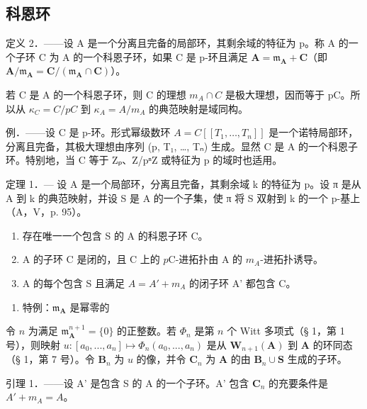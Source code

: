 \subsection{科恩环}

定义 2．——设 A 是一个分离且完备的局部环，其剩余域的特征为 p。称 A 的一个子环 C 为 A 的一个科恩子环，如果 C 是 p-环且满足 \(\mathbf{A} = \mathfrak{m}_{\mathbf{A}} + \mathbf{C}\)（即 \(\mathbf{A}/\mathfrak{m}_{\mathbf{A}} = \mathbf{C}/(\mathfrak{m}_{\mathbf{A}} \cap \mathbf{C})\)）。

若 C 是 A 的一个科恩子环，则 C 的理想 \(m_{A} \cap C\) 是极大理想，因而等于 pC。所以从 \(\kappa_{C} = C/pC\) 到 \(\kappa_{A} = A/m_{A}\) 的典范映射是域同构。

例．——设 C 是 p-环。形式幂级数环 \(A = C[[T_{1}, \ldots, T_{n}]]\) 是一个诺特局部环，分离且完备，其极大理想由序列 (p, T₁, \ldots, Tₙ) 生成。显然 C 是 A 的一个科恩子环。特别地，当 C 等于 Zₚ、Z/pⁿZ 或特征为 p 的域时也适用。

定理 1．— 设 A 是一个局部环，分离且完备，其剩余域 k 的特征为 p。设 π 是从 A 到 k 的典范映射，并设 S 是 A 的一个子集，使 π 将 S 双射到 k 的一个 p-基上（A，V，p. 95）。

\begin{enumerate}
\def\labelenumi{\alph{enumi})}
\item
  存在唯一一个包含 S 的 A 的科恩子环 C。
\item
  A 的子环 C 是闭的，且 C 上的 \(p\)C-进拓扑由 A 的 \(m_{A}\)-进拓扑诱导。
\item
  A 的每个包含 S 且满足 \(A = A' + m_{A}\) 的闭子环 A' 都包含 C。
\end{enumerate}

\begin{enumerate}
\def\labelenumi{\Alph{enumi})}
\tightlist
\item
  特例：\(\mathfrak{m}_{\mathbf{A}}\) 是幂零的
\end{enumerate}

令 \(n\) 为满足 \(\mathfrak{m}_{\mathbf{A}}^{n+1}=\{0\}\) 的正整数。若 \(\Phi_{n}\) 是第 \(n\) 个 Witt 多项式（§ 1，第 1 号），则映射 \(u:[a_{0},..., a_{n}]\mapsto\Phi_{n}(a_{0},..., a_{n})\) 是从 \(\mathbf{W}_{n+1}(\mathbf{A})\) 到 \(\mathbf{A}\) 的环同态（§ 1，第 7 号）。令 \(\mathbf{B}_{n}\) 为 \(u\) 的像，并令 \(\mathbf{C}_{n}\) 为 \(\mathbf{A}\) 的由 \(\mathbf{B}_{n}\cup\mathbf{S}\) 生成的子环。

引理 1．——设 A' 是包含 S 的 A 的一个子环。A' 包含 \(\mathbf{C}_{n}\) 的充要条件是 \(A' + m_{A} = A\)。

